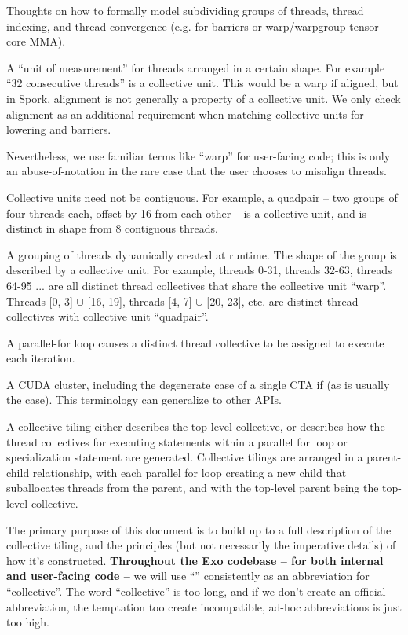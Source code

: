 
Thoughts on how to formally model subdividing groups of threads, thread indexing, and thread convergence (e.g. for barriers or warp/warpgroup tensor core MMA).

\filbreak
{} A ``unit of measurement'' for threads arranged in a certain shape.
For example ``32 consecutive threads'' is a collective unit.
This would be a warp if aligned, but in Spork, alignment is not generally a property of a collective unit.
We only check alignment as an additional requirement when matching collective units for lowering  and barriers.

\filbreak
Nevertheless, we use familiar terms like ``warp'' for user-facing code; this is only an abuse-of-notation in the rare case that the user chooses to misalign threads.

\filbreak
Collective units need not be contiguous.
For example, a quadpair -- two groups of four threads each, offset by 16 from each other -- is a collective unit, and is distinct in shape from 8 contiguous threads.

\filbreak
{} A grouping of threads dynamically created at runtime.
The shape of the group is described by a collective unit.
For example, threads 0-31, threads 32-63, threads 64-95 ... are all distinct thread collectives that share the collective unit ``warp''.
Threads [0, 3] $\cup$ [16, 19], threads [4, 7] $\cup$ [20, 23], etc. are distinct thread collectives with collective unit ``quadpair''.

\filbreak
A parallel-for loop causes a distinct thread collective to be assigned to execute each iteration.

\filbreak
{} A CUDA cluster, including the degenerate case of a single CTA if  (as is usually the case).
This terminology can generalize to other APIs.

\filbreak
{} A collective tiling either describes the top-level collective, or describes how the thread collectives for executing statements within a parallel for loop or specialization statement are generated.
Collective tilings are arranged in a parent-child relationship, with each parallel for loop creating a new child that suballocates threads from the parent, and with the top-level parent being the top-level collective.

\filbreak
The primary purpose of this document is to build up to a full description of the collective tiling, and the principles (but not necessarily the imperative details) of how it's constructed.
\textbf{Throughout the Exo codebase -- for both internal and user-facing code -- } we will use ``'' consistently as an abbreviation for ``collective''.
The word ``collective'' is too long, and if we don't create an official abbreviation, the temptation too create incompatible, ad-hoc abbreviations is just too high.

